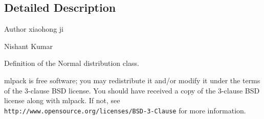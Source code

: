 \subsection{Detailed Description}
\begin{DoxyAuthor}{Author}
xiaohong ji 

Nishant Kumar
\end{DoxyAuthor}
Definition of the Normal distribution class.

mlpack is free software; you may redistribute it and/or modify it under the terms of the 3-\/clause B\+SD license. You should have received a copy of the 3-\/clause B\+SD license along with mlpack. If not, see {\tt http\+://www.\+opensource.\+org/licenses/\+B\+S\+D-\/3-\/\+Clause} for more information. 